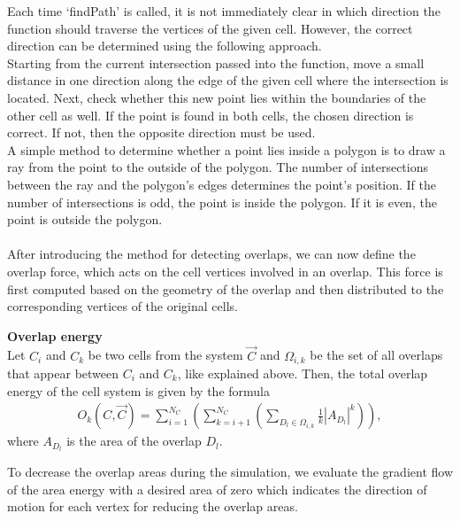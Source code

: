Each time `findPath' is called, it is not immediately clear in which direction the function should traverse the vertices of the given cell. 
However, the correct direction can be determined using the following approach. \\
Starting from the current intersection passed into the function, move a small distance in one direction along the edge of the given cell where the intersection is located. Next, check whether this new point lies within the boundaries of the other cell as well. 
If the point is found in both cells, the chosen direction is correct. 
If not, then the opposite direction must be used. \\ 
A simple method to determine whether a point lies inside a polygon is to draw a ray from the point to the outside of the polygon. 
The number of intersections between the ray and the polygon's edges determines the point's position. 
If the number of intersections is odd, the point is inside the polygon.
If it is even, the point is outside the polygon. \\ 
\smallskip  \\
After introducing the method for detecting overlaps, we can now define the overlap force, which acts on the cell vertices involved in an overlap. 
This force is first computed based on the geometry of the overlap and then distributed to the corresponding vertices of the original cells. 

\begin{definition} \textbf{Overlap energy} \\
	Let $C_i$ and $C_k$ be two cells from the system $\vec{C}$ and $\Omega_{i,k}$ be the set of all overlaps that appear between $C_i$ and $C_k$, like explained above. Then, the total overlap energy of the cell system is given by the formula 
	\begin{align}
		O_k(C, \vec{C}) = \sum\limits_{i=1}^{N_C} \left( \sum\limits_{k=i+1}^{N_C} (\sum\limits_{D_l \in \Omega_{i,k}} \frac{1}{k}|A_{D_l}|^k) \right),		
	\end{align} 
	where $A_{D_l}$ is the area of the overlap $D_l$.  \\
\end{definition}

To decrease the overlap areas during the simulation, we evaluate the gradient flow of the area energy with a desired area of zero which indicates the direction of motion for each vertex for reducing the overlap areas.

